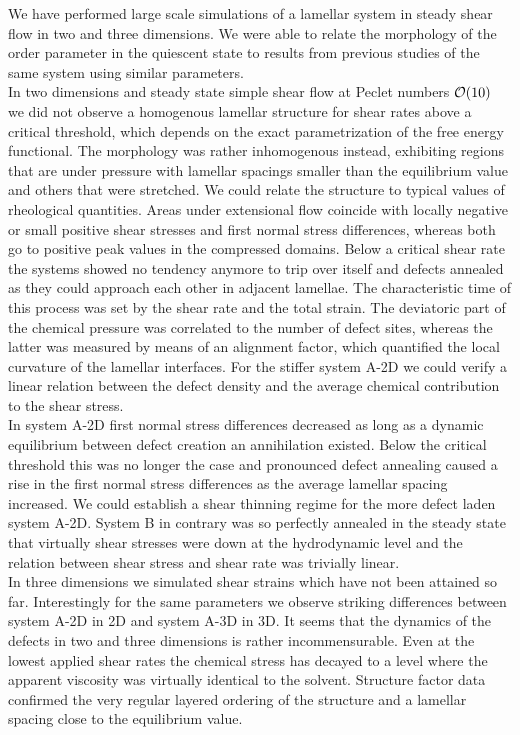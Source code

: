 \documentclass[8.5pt,twoside,twocolumn]{article}
\begin{document}
We have performed large scale simulations of a lamellar system in steady shear flow  in two and three dimensions.
We were able to relate the morphology of the order parameter in the quiescent state to results from previous studies of the same system using similar parameters.\\
In two dimensions and steady state simple shear flow at Peclet numbers ${\cal O}(10)$ we did not observe a homogenous lamellar structure for shear rates above a critical threshold, which depends on the exact parametrization of the free energy functional.
The morphology was rather inhomogenous instead, exhibiting regions that are under pressure with lamellar spacings smaller than the equilibrium value and others that were stretched.
We could relate the structure to typical values of rheological quantities.
Areas under extensional flow coincide with locally negative or small positive shear stresses and first normal stress differences, whereas both go to positive peak values in the compressed domains.
Below a critical shear rate the systems showed no tendency anymore to trip over itself and defects annealed as they could approach each other in adjacent lamellae.
The characteristic time of this process was set by the shear rate and the total strain.
The deviatoric part of the chemical pressure was correlated to the number of defect sites, whereas the latter was measured by means of an alignment factor, which quantified the local curvature of the lamellar interfaces.
For the stiffer system A-2D we could verify a linear relation between the defect density and the average chemical contribution to the shear stress.\\ 
In system A-2D first normal stress differences decreased as long as a dynamic equilibrium between defect creation an annihilation existed.
Below the critical threshold this was no longer the case and pronounced defect annealing caused a rise in the first normal stress differences as the average lamellar spacing increased.
We could establish a shear thinning regime for the more defect laden system A-2D.
System B in contrary was so perfectly annealed in the steady state that virtually shear stresses were down at the hydrodynamic level and the relation between shear stress and shear rate was trivially linear.\\
In three dimensions we simulated shear strains which have not been attained so far.
Interestingly for the same parameters we observe striking differences between system A-2D in 2D and system A-3D in 3D.
It seems that the dynamics of the defects in two and three dimensions is rather incommensurable.
Even at the lowest applied shear rates the chemical stress has decayed to a level where the apparent viscosity was virtually identical to the solvent.
Structure factor data confirmed the very regular layered ordering of the structure and a lamellar spacing close to the equilibrium value. 
\end{document}
